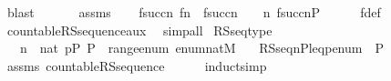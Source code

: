 \begin{isabellebody}
\ blast\isanewline
\ \ \isacommand{{\isacharbraceright}{\kern0pt}}\isamarkupfalse%
\isanewline
\ \ \isamarkupfalse%
\ assms\isanewline
\ \ \isamarkupfalse%
\ {\isachardoublequoteopen}f{\isacharbackquote}{\kern0pt}succ{\isacharparenleft}{\kern0pt}n{\isacharparenright}{\kern0pt}{\isasympreceq}\ f{\isacharbackquote}{\kern0pt}n\ {\isasymand}\ f{\isacharbackquote}{\kern0pt}succ{\isacharparenleft}{\kern0pt}n{\isacharparenright}{\kern0pt}\ {\isasymin}\ {\isasymD}\ {\isacharbackquote}{\kern0pt}\ n{\isachardoublequoteclose}\ {\isachardoublequoteopen}f{\isacharbackquote}{\kern0pt}succ{\isacharparenleft}{\kern0pt}n{\isacharparenright}{\kern0pt}{\isasymin}P{\isachardoublequoteclose}\isanewline
\ \ \ \ \isamarkupfalse%
\ f{\isacharunderscore}{\kern0pt}def\ \isamarkupfalse%
\ countable{\isacharunderscore}{\kern0pt}RS{\isacharunderscore}{\kern0pt}sequence{\isacharunderscore}{\kern0pt}aux\ \isamarkupfalse%
\ simp{\isacharunderscore}{\kern0pt}all\isanewline
{}\isamarkupfalse%
%
\endisatagproof
{\isafoldproof}%
%
\isadelimproof
\isanewline
%
\endisadelimproof
\isanewline
{}\isamarkupfalse%
\ RS{\isacharunderscore}{\kern0pt}seq{\isacharunderscore}{\kern0pt}type{\isacharcolon}{\kern0pt}\ \isanewline
\ \ \ {\isachardoublequoteopen}n\ {\isasymin}\ nat{\isachardoublequoteclose}\ {\isachardoublequoteopen}p{\isasymin}P{\isachardoublequoteclose}\ {\isachardoublequoteopen}P\ {\isasymsubseteq}\ range{\isacharparenleft}{\kern0pt}enum{\isacharparenright}{\kern0pt}{\isachardoublequoteclose}\ {\isachardoublequoteopen}enum{\isacharcolon}{\kern0pt}nat{\isasymrightarrow}M{\isachardoublequoteclose}\isanewline
\ \ \ {\isachardoublequoteopen}RS{\isacharunderscore}{\kern0pt}seq{\isacharparenleft}{\kern0pt}n{\isacharcomma}{\kern0pt}P{\isacharcomma}{\kern0pt}leq{\isacharcomma}{\kern0pt}p{\isacharcomma}{\kern0pt}enum{\isacharcomma}{\kern0pt}{\isasymD}{\isacharparenright}{\kern0pt}\ {\isasymin}\ P{\isachardoublequoteclose}\isanewline
%
\isadelimproof
\ \ %
\endisadelimproof
%
\isatagproof
{}\isamarkupfalse%
\ assms\ countable{\isacharunderscore}{\kern0pt}RS{\isacharunderscore}{\kern0pt}sequence{\isacharparenleft}{\kern0pt}{}{\isacharcomma}{\kern0pt}{}{\isacharparenright}{\kern0pt}\ \ \isanewline
\ \ \isamarkupfalse%
\ {\isacharparenleft}{\kern0pt}induct{\isacharsemicolon}{\kern0pt}simp{\isacharparenright}{\kern0pt}%
\endisatagproof
{\isafoldproof}%
%
\isadelimproof
\ \isanewline
%
\endisadelimproof

\end{isabellebody}
